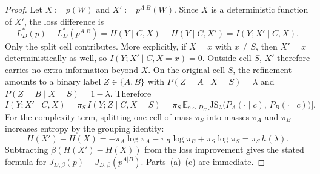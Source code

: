 \documentclass[twoside,11pt]{article}
\newcommand{\E}{\mathbb{E}}
\newcommand{\JS}{\mathrm{JS}}
\begin{document}
\begin{proof}
Let $X := p(W)$ and $X' := p^{A|B}(W)$. Since $X$ is a deterministic function of $X'$, the loss difference is
\[
L_D^*(p) - L_D^*(p^{A|B})
= H(Y \mid C, X) - H(Y \mid C, X')
= I(Y; X' \mid C, X).
\]
Only the split cell contributes. More explicitly, if $X=x$ with $x \neq S$, then $X'=x$ deterministically as well, so $I(Y;X' \mid C, X=x)=0$. Outside cell $S$, $X'$ therefore carries no extra information beyond $X$. On the original cell $S$, the refinement amounts to a binary label $Z \in \{A,B\}$ with $P(Z=A \mid X=S)=\lambda$ and $P(Z=B \mid X=S)=1-\lambda$. Therefore
\[
I(Y; X' \mid C, X)
= \pi_S\, I(Y; Z \mid C, X=S)
= \pi_S\, \E_{c \sim D_C}\bigl[
	    \JS_{\lambda}\bigl(\bar P_A(\cdot \mid c),\, \bar P_B(\cdot \mid c)\bigr)
	  \bigr].
\]
For the complexity term, splitting one cell of mass $\pi_S$ into masses $\pi_A$ and $\pi_B$ increases entropy by the grouping identity:
\[
H(X') - H(X)
= -\pi_A \log \pi_A - \pi_B \log \pi_B + \pi_S \log \pi_S
= \pi_S\, h(\lambda).
\]
Subtracting $\beta(H(X')-H(X))$ from the loss improvement gives the stated formula for $J_{D,\beta}(p) - J_{D,\beta}(p^{A|B})$. Parts~(a)--(c) are immediate.
\end{proof}
\end{document}

